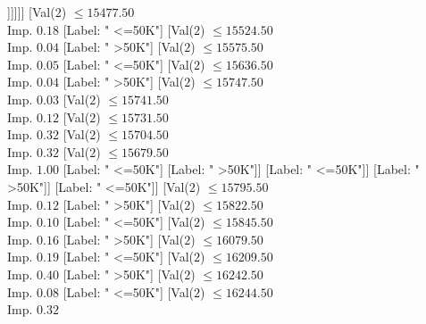 \documentclass[margin=10pt]{standalone}
\begin{document}
\begin{forest}
																						[Val($2$) $ \leq 14797.50$ \\ Imp. $0.17$
																							[Label: " >50K"]
																							[Val($2$) $ \leq 14812.50$ \\ Imp. $0.92$
																								[Label: " <=50K"]
																								[Label: " >50K"]]]]]]
																			[Val($2$) $ \leq 15477.50$ \\ Imp. $0.18$
																				[Label: " <=50K"]
																				[Val($2$) $ \leq 15524.50$ \\ Imp. $0.04$
																					[Label: " >50K"]
																					[Val($2$) $ \leq 15575.50$ \\ Imp. $0.05$
																						[Label: " <=50K"]
																						[Val($2$) $ \leq 15636.50$ \\ Imp. $0.04$
																							[Label: " >50K"]
																							[Val($2$) $ \leq 15747.50$ \\ Imp. $0.03$
																								[Val($2$) $ \leq 15741.50$ \\ Imp. $0.12$
																									[Val($2$) $ \leq 15731.50$ \\ Imp. $0.32$
																										[Val($2$) $ \leq 15704.50$ \\ Imp. $0.32$
																											[Val($2$) $ \leq 15679.50$ \\ Imp. $1.00$
																												[Label: " <=50K"]
																												[Label: " >50K"]]
																											[Label: " <=50K"]]
																										[Label: " >50K"]]
																									[Label: " <=50K"]]
																								[Val($2$) $ \leq 15795.50$ \\ Imp. $0.12$
																									[Label: " >50K"]
																									[Val($2$) $ \leq 15822.50$ \\ Imp. $0.10$
																										[Label: " <=50K"]
																										[Val($2$) $ \leq 15845.50$ \\ Imp. $0.16$
																											[Label: " >50K"]
																											[Val($2$) $ \leq 16079.50$ \\ Imp. $0.19$
																												[Label: " <=50K"]
																												[Val($2$) $ \leq 16209.50$ \\ Imp. $0.40$
																													[Label: " >50K"]
																													[Val($2$) $ \leq 16242.50$ \\ Imp. $0.08$
																														[Label: " <=50K"]
																														[Val($2$) $ \leq 16244.50$ \\ Imp. $0.32$

\end{forest}
\end{document}

